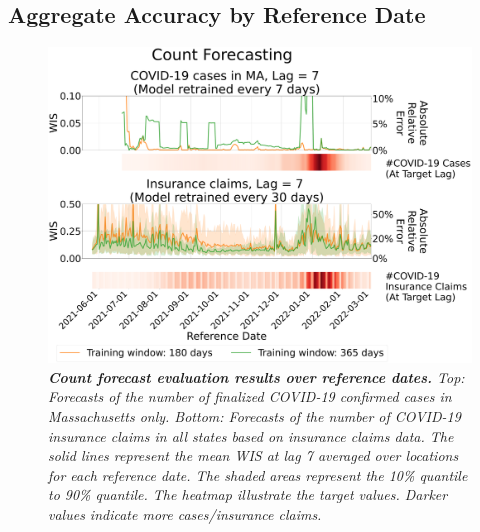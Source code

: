\subsection{Aggregate Accuracy by Reference Date}

\begin{figure}[h!]
    \centering
    \includegraphics[width=\textwidth]{figs/experiment_count_result_time_series.pdf}
    \caption{\emph{\textbf{Count forecast evaluation results over reference dates.} Top: Forecasts of the number of finalized COVID-19 confirmed cases in Massachusetts only. Bottom: Forecasts of the number of COVID-19 insurance claims in all states based on insurance claims data. The solid lines represent the mean WIS at lag 7 averaged over locations for each reference date. The shaded areas represent the 10\% quantile to 90\% quantile. The heatmap illustrate the target values. Darker values indicate more cases/insurance claims.}}
\end{figure}

